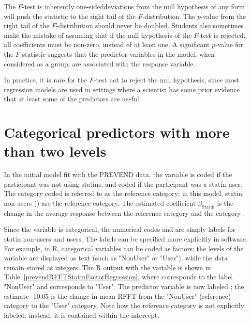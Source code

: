 The $F$-test is inherently one-sided\textemdash deviations from the null hypothesis of any form will push the statistic to the right tail of the $F$-distribution.  The $p$-value from the right tail of the $F$-distribution should never be doubled.  Students also sometimes make the mistake of assuming that if the null hypothesis of the $F$-test is rejected, all coefficients must be non-zero, instead of at least one. A significant $p$-value for the $F$-statistic suggests that the predictor variables in the model, when considered as a group, are associated with the response variable.

In practice, it is rare for the $F$-test not to reject the null hypothesis, since most regression models are used in settings where a scientist has some prior evidence that at least some of the predictors are useful.

\section{Categorical predictors with more than two levels}
\label{categoricalMoreThanTwoLevels}

In the initial model fit with the PREVEND data, the variable  is coded  if the participant was not using statins, and coded  if the participant was a statin user. The category coded  is referred to as the reference category; in this model, statin non-users () are the reference category. The estimated coefficient $\beta_{\text{Statin}}$ is the change in the average response between the reference category and the category .

Since the variable  is categorical, the numerical codes  and  are simply labels for statin non-users and users. The labels can be specified more explicitly in software. For example, in \textsf{R}, categorical variables can be coded as factors; the levels of the variable are displayed as text (such as "NonUser" or "User"), while the data remain stored as integers. The \textsf{R} output with the variable  is shown in Table~\ref{prevendRFFTStatinFactorRegression}, where  corresponds to the label "NonUser" and  corresponds to "User". The predictor variable is now labeled ; the estimate -10.05 is the change in mean RFFT from the "NonUser" (reference) category to the "User" category. Note how the reference category is not explicitly labeled; instead, it is contained within the intercept. 

